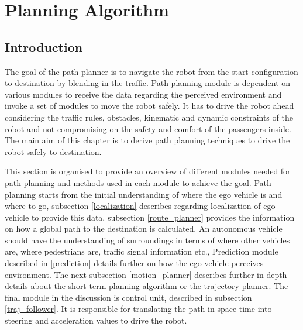 \chapter{Planning Algorithm}
\section{Introduction}


The goal of the path planner is to navigate the robot from the start configuration to destination by blending in the traffic. Path planning module is dependent on various modules to receive the data regarding the perceived environment and invoke a set of modules to move the robot safely. It has to drive the robot ahead considering the traffic rules, obstacles, kinematic and dynamic constraints of the robot and not compromising on the safety and comfort of the passengers inside. The main aim of this chapter is to derive path planning techniques to drive the robot safely to destination.

This section is organised to provide an overview of different modules needed for path planning and methods used in each module to achieve the goal. Path planning starts from the initial understanding of where the ego vehicle is and where to go, subsection \ref{localization} describes regarding localization of ego vehicle to provide this data, subsection \ref{route_planner} provides the information on how a global path to the destination is calculated. An autonomous vehicle should have the understanding of surroundings in terms of where other vehicles are, where pedestrians are, traffic signal information etc., Prediction module described in \ref{prediction} details further on how the ego vehicle perceives environment. The next subsection \ref{motion_planner} describes further in-depth details about the short term planning algorithm or the trajectory planner. The final module in the discussion is control unit, described in subsection \ref{traj_follower}. It is responsible for translating the path in space-time into steering and acceleration values to drive the robot.

